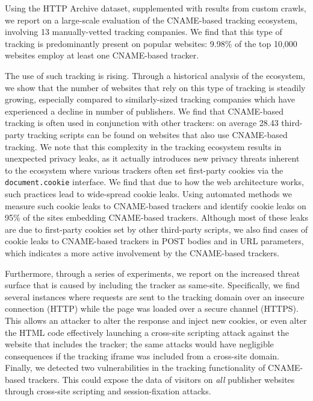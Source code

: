 Using the HTTP Archive dataset, supplemented with results from custom crawls, we report on a large-scale evaluation of the CNAME-based tracking ecosystem, involving 13 manually-vetted tracking companies.
We find that this type of tracking is predominantly present on popular websites: 9.98\% of the top 10,000 websites employ at least one CNAME-based tracker.

The use of such tracking is rising. Through a historical analysis of the ecosystem, we show that the number of websites that rely on this type of tracking is steadily growing, especially compared to similarly-sized tracking companies which have experienced a decline in number of publishers.
We find that CNAME-based tracking is often used in conjunction with other trackers: on average 28.43 third-party tracking scripts can be found on websites that also use CNAME-based tracking.
We note that this complexity in the tracking ecosystem results in unexpected privacy leaks, as it actually introduces new privacy threats inherent to the ecosystem where various trackers often set first-party cookies via the \texttt{document.cookie} interface. We find that due to how the web architecture works, such practices lead to wide-spread cookie leaks. Using automated methods we measure such cookie leaks to CNAME-based trackers and identify cookie leaks on 95\% of the sites embedding CNAME-based trackers.
Although most of these leaks are due to first-party cookies set by other third-party scripts, we also find cases of cookie leaks to CNAME-based trackers in POST bodies and in URL parameters, which indicates a more active involvement by the CNAME-based trackers.

Furthermore, through a series of experiments, we report on the increased threat surface that is caused by including the tracker as same-site.
Specifically, we find several instances where requests are sent to the tracking domain over an insecure connection (HTTP) while the page was loaded over a secure channel (HTTPS).
This allows an attacker to alter the response and inject new cookies, or even alter the HTML code effectively launching a cross-site scripting attack against the website that includes the tracker; the same attacks would have negligible consequences if the tracking iframe was included from a cross-site domain.
Finally, we detected two vulnerabilities in the tracking functionality of CNAME-based trackers.
This could expose the data of visitors on \emph{all} publisher websites through cross-site scripting and session-fixation attacks.

